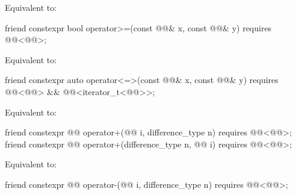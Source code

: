 \begin{itemdescr}
\pnum
\effects
Equivalent to: 
\end{itemdescr}

%
\begin{itemdecl}
friend constexpr bool operator>=(const @@& x, const @@& y)
  requires @@<@@>;
\end{itemdecl}

\begin{itemdescr}
\pnum
\effects
Equivalent to: 
\end{itemdescr}

%
\begin{itemdecl}
friend constexpr auto operator<=>(const @@& x, const @@& y)
  requires @@<@@> && @@<iterator_t<@@>>;
\end{itemdecl}

\begin{itemdescr}
\pnum
\effects
Equivalent to: 
\end{itemdescr}

%
\begin{itemdecl}
friend constexpr @@ operator+(@@ i, difference_type n)
  requires @@<@@>;
friend constexpr @@ operator+(difference_type n, @@ i)
  requires @@<@@>;
\end{itemdecl}

\begin{itemdescr}
\pnum
\effects
Equivalent to: 
\end{itemdescr}

%
\begin{itemdecl}
friend constexpr @@ operator-(@@ i, difference_type n)
  requires @@<@@>;
\end{itemdecl}

